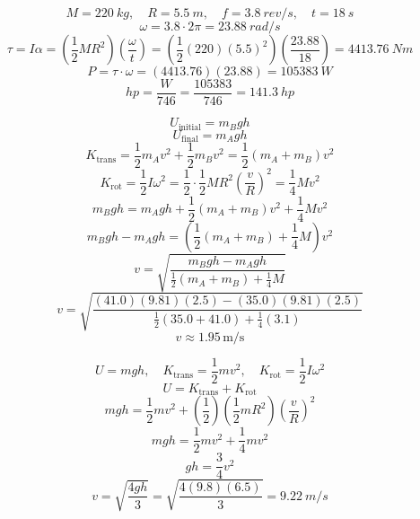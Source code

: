 \documentclass[11pt]{homework}
\begin{document}
\setcounter{questionCounter}{63}
\question
\[
M=\qty{220}{kg}, \quad R=\qty{5.5}{m}, \quad f=\qty{3.8}{rev /s}, \quad t=\qty{18}{s}
\]
\[
\omega=3.8 \cdot 2\pi = \qty{23.88}{rad /s}
\]
\[
\tau = I\alpha = (\frac{1}{2}MR^2)(\frac{\omega}{t}) = (\frac{1}{2}(220)(5.5)^2)(\frac{23.88}{18}) = \qty{4413.76}{Nm}
\]\[
P = \tau \cdot \omega = (4413.76)(23.88) = \qty{105383}{W}
\]\[
hp = \frac{W}{746} = \frac{105383}{746} = \boxed{\qty{141.3}{hp}}
\]


\setcounter{questionCounter}{66}
\question
\[
U_{\text{initial}} = m_B  g  h
\]
\[
U_{\text{final}} = m_A  g  h
\]
\[
K_{\text{trans}} = \frac{1}{2} m_A v^2 + \frac{1}{2} m_B v^2 = \frac{1}{2} (m_A + m_B) v^2
\]
\[
K_{\text{rot}} = \frac{1}{2} I \omega^2 = \frac{1}{2} \cdot \frac{1}{2} M R^2  \left( \frac{v}{R} \right)^2 = \frac{1}{4} M v^2
\]
\[
m_B  gh  = m_A  g  h + \frac{1}{2} (m_A + m_B) v^2 + \frac{1}{4} M v^2
\]
\[
m_B  g  h - m_A g h = \left( \frac{1}{2} (m_A + m_B) + \frac{1}{4} M \right) v^2
\]
\[
v = \sqrt{\frac{m_B  g  h - m_A g  h}{\frac{1}{2} (m_A + m_B) + \frac{1}{4} M}}
\]
\[
v = \sqrt{\frac{(41.0)(9.81)(2.5) - (35.0)(9.81)(2.5)}{\frac{1}{2} (35.0 + 41.0) + \frac{1}{4}(3.1)}}
\]
\[
    v \approx \boxed{1.95 \, \text{m/s}}
\]


\setcounter{questionCounter}{68}
\question
\[
    U = mgh, \quad K_{\text{trans}}=\frac{1}{2}mv^2, \quad K_{\text{rot}}=\frac{1}{2}I\omega^2
\]
\[
    U = K_{\text{trans}}+K_{\text{rot}}
\]
\[
mgh=\frac{1}{2}mv^2 + (\frac{1}{2})(\frac{1}{2}mR^2)(\frac{v}{R})^2
\]
\[
mgh=\frac{1}{2}mv^2 + \frac{1}{4}mv^2
\]
\[
gh = \frac{3}{4}v^2
\]
\[
v = \sqrt{\frac{4gh}{3}}=\sqrt{\frac{4(9.8)(6.5)}{3}}=\boxed{\qty{9.22}{m /s}}
\]
\end{document}
